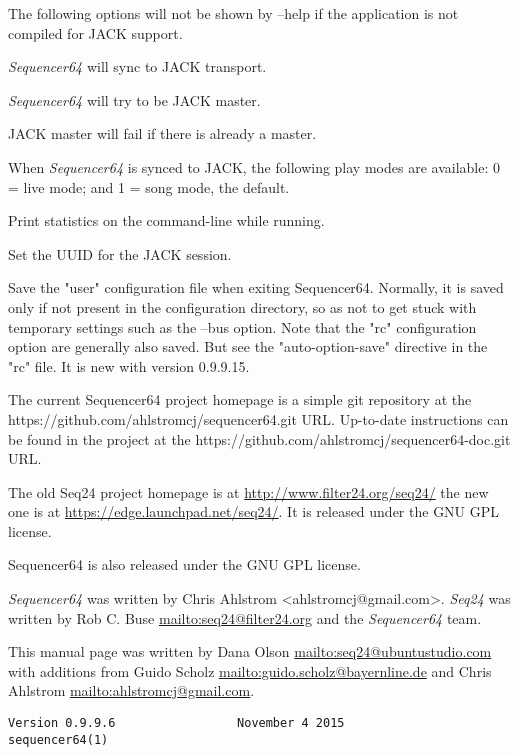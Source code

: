       The following options will not be shown by --help if the application is
      not compiled for JACK support.

      \textsl{Sequencer64} will sync to JACK transport.

      \textsl{Sequencer64} will try to be JACK master.

      JACK master will fail if there is already a master.

      When \textsl{Sequencer64} is synced to JACK, the following play modes
      are available: 0 = live mode; and 1 = song mode, the default.

      Print statistics on the command-line while running.

      Set the UUID for the JACK session.

      Save the "user" configuration file when exiting Sequencer64.
      Normally, it is saved only if not present in the configuration directory,
      so as not to get stuck with temporary settings such as the --bus option.
      Note that the "rc" configuration option are generally also saved.
      But see the "auto-option-save" directive in the "rc" file.
      It is new with version 0.9.9.15.

   The current Sequencer64 project homepage is a simple git repository at the
   https://github.com/ahlstromcj/sequencer64.git URL.
   Up-to-date instructions can be found in the project at the
   https://github.com/ahlstromcj/sequencer64-doc.git URL.

   The old Seq24 project homepage is at
   \url{http://www.filter24.org/seq24/} the new
   one is at \url{https://edge.launchpad.net/seq24/}.
   It is released under the GNU GPL license.

   Sequencer64 is also released under the GNU GPL license.

   \textsl{Sequencer64} was written by Chris Ahlstrom <ahlstromcj@gmail.com>.
   \textsl{Seq24} was written by Rob C. Buse \url{mailto:seq24@filter24.org}
   and the \textsl{Sequencer64} team.

   This manual page was written by Dana Olson
   \url{mailto:seq24@ubuntustudio.com} with additions from Guido Scholz
   \url{mailto:guido.scholz@bayernline.de} and Chris Ahlstrom
   \url{mailto:ahlstromcj@gmail.com}.

   \begin{verbatim}
Version 0.9.9.6                 November 4 2015                  sequencer64(1)
   \end{verbatim}

